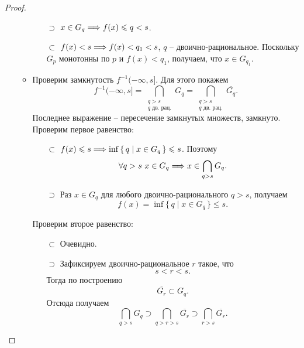 \begin{proof}
\begin{itemize}
\begin{itemize}
                    \begin{itemize}
                        \item[$\supset$] $x \in G_q \Longrightarrow f(x) \leqslant q < s$.
                        \item[$\subset$] $f(x) < s \Longrightarrow f(x) < q_1 < s$, $q$ -- 
                            двоично-рациональное. Поскольку $G_p$ монотонны по
                            $p$ и $f(x) < q_1$, получаем, что $x \in G_{q_1}$.
                    \end{itemize}
                \item Проверим замкнутость $f^{-1}(-\infty, s]$. Для этого
                    покажем
                    \[
                        f^{-1}(-\infty, s] = \bigcap_{\substack{q > s \\ 
                        q \text{ дв. рац.}}}{G_q} = \bigcap_{\substack{q > s \\
                        q \text{ дв. рац.}}}{\overline{G_q}}
                    .\]
                    Последнее выражение -- пересечение замкнутых множеств, замкнуто.
                    Проверим первое равенство:
                    \begin{itemize}
                        \item[$\subset$] $f(x) \leqslant s \Longrightarrow \inf{\{\,
                            q \mid x \in G_q \,\}} \leqslant s$. Поэтому
                            \[
                                \forall q > s~ x \in G_q \Longrightarrow x \in \bigcap_{q > s}{G_q}
                            .\]
                        \item[$\supset$] Раз $x \in G_q$ для любого двоично-рационального 
                            $q > s$, получаем
                            \[
                                f(x) = \inf{\{\, q \mid x \in G_q \,\}} \leqslant s
                            .\]
                    \end{itemize}
                    Проверим второе равенство:
                    \begin{itemize}
                        \item[$\subset$] Очевидно.
                        \item[$\supset$] Зафиксируем двоично-рациональное $r$
                            такое, что
                            \[
                                s < r < s
                            .\]
                            Тогда по построению
                            \[
                                \overline{G_r} \subset G_q
                            .\]
                            Отсюда получаем
                            \[
                                \bigcap_{q > s}{G_q} \supset \bigcap_{q > r > s}
                                {\overline{G_r}} \supset \bigcap_{r > s}{\overline{G_r}}
                            .\]
                    \end{itemize}
            \end{itemize}
    \end{itemize}
\end{proof}

